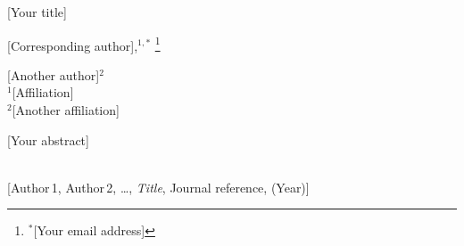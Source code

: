 \documentclass[a4paper]{article}
\newcommand\blfootnote[1]{%
  \begingroup
  \renewcommand\thefootnote{}\footnote{#1}%
  \addtocounter{footnote}{-1}%
  \endgroup
}
\begin{document}

\Large
\begin{center}
[Your title]
\vspace{0.3cm}

\large
[Corresponding author],$^{1,*}$\blfootnote{
$^*$[Your email address]
}
[Another author]$^2$\\
\vspace{0.3cm}
\small  
$^1$[Affiliation]\\
$^2$[Another affiliation]\\
\end{center}

\normalsize

[Your abstract]

\footnotesize
~~\\[1pt]
[Author$\,$1, Author$\,$2, \dots,  \emph{Title}, Journal reference, (Year)]\\
\end{document}
